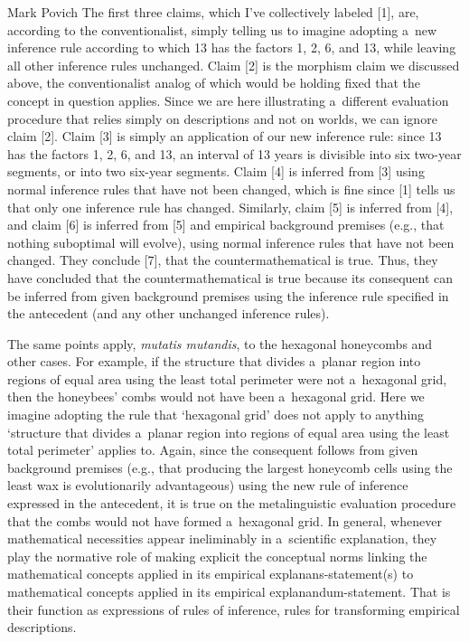 \begin{artengenv}{Mark Povich}
The first three claims, which I've collectively labeled [1], are, according to the conventionalist, simply telling us to imagine adopting a~new inference rule according to which 13 has the factors 1, 2, 6, and 13, while leaving all other inference rules unchanged. Claim [2] is the morphism claim we discussed above, the conventionalist analog of which would be holding fixed that the concept in question applies. Since we are here illustrating a~different evaluation procedure that relies simply on descriptions and not on worlds, we can ignore claim [2]. Claim [3] is simply an application of our new inference rule: since 13 has the factors 1, 2, 6, and 13, an interval of 13 years is divisible into six two-year segments, or into two six-year segments. Claim [4] is inferred from [3] using normal inference rules that have not been changed, which is fine since [1] tells us that only one inference rule has changed. Similarly, claim [5] is inferred from [4], and claim [6] is inferred from [5] and empirical background premises (e.g., that nothing suboptimal will evolve), using normal inference rules that have not been changed. They conclude [7], that the countermathematical is true. Thus, they have concluded that the countermathematical is true because its consequent can be inferred from given background premises using the inference rule specified in the antecedent (and any other unchanged inference rules).

The same points apply, \textit{mutatis mutandis}, to the hexagonal honeycombs and other cases. For example, if the structure that divides a~planar region into regions of equal area using the least total perimeter were not a~hexagonal grid, then the honeybees' combs would not have been a~hexagonal grid. Here we imagine adopting the rule that ‘hexagonal grid' does not apply to anything ‘structure that divides a~planar region into regions of equal area using the least total perimeter' applies to. Again, since the consequent follows from given background premises (e.g., that producing the largest honeycomb cells using the least wax is evolutionarily advantageous) using the new rule of inference expressed in the antecedent, it is true on the metalinguistic evaluation procedure that the combs would not have formed a~hexagonal grid. In general, whenever mathematical necessities appear ineliminably in a~scientific explanation, they play the normative role of making explicit the conceptual norms linking the mathematical concepts applied in its empirical explanans-statement(s) to mathematical concepts applied in its empirical explanandum-statement. That is their function as expressions of rules of inference, rules for transforming empirical descriptions.


\end{artengenv}
